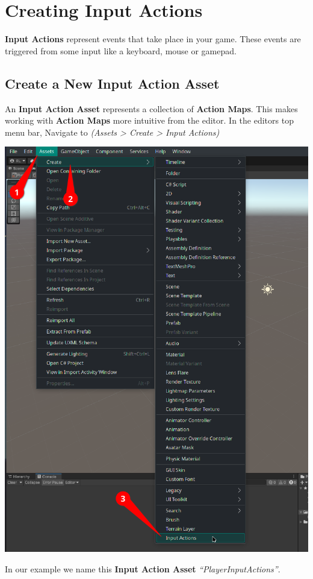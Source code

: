 \documentclass[a4paper,11pt,twoside]{article}
\begin{document}
\section*{Creating Input Actions}
\label{sec:org03ccaf4}
\textbf{Input Actions} represent events that take place in your game. These events are triggered from some input like a keyboard, mouse or gamepad.
\subsection*{Create a New Input Action Asset}
\label{sec:orgfbad295}
An \textbf{Input Action Asset} represents a collection of \textbf{Action Maps}. This makes working with \textbf{Action Maps} more intuitive from the editor.
In the editors top menu bar, Navigate to \emph{(Assets > Create > Input Actions)}
\begin{center}
\includegraphics[width=.9\linewidth]{./SnapShots/InputActionAsset.png}
\end{center}
In our example we name this \textbf{Input Action Asset} \emph{``PlayerInputActions''}.
\end{document}
